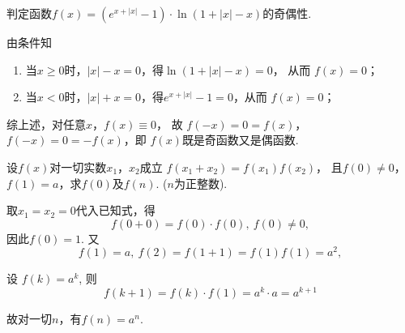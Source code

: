 \begin{problem}判定函数$f\left( x \right) = \left( e^{x + \left| x \right|} - 1 \right) \cdot \ln\left( 1 + \left| x \right| - x \right)$的奇偶性.
	
	\begin{solution}
		由条件知
		\begin{enumerate}
			\item 当$x \geq 0$时，$\left| x \right| - x = 0$，得$\ln\left( 1 + \left| x \right| - x \right) = 0$，
			从而 $f\left( x \right) = 0$；
			\item 当$x < 0$时，$\left| x \right| + x = 0$，得$e^{x + \left| x \right|} - 1 = 0$，从而 $f\left( x \right) = 0$；
		\end{enumerate}
		
		
		
		
		综上述，对任意$x$，$f\left( x \right) \equiv 0$，
		故
		$f\left( - x \right) = 0 = f\left( x \right)$，$f\left( - x \right) = 0 = - f\left( x \right)$，即
		$f\left( x \right)$既是奇函数又是偶函数.
		
	\end{solution}   
	
\end{problem}           



\begin{problem}设$f\left( x \right)$对一切实数$x_{1}$，$x_{2}$成立
	$f\left( x_{1} + x_{2} \right) = f\left( x_{1} \right)f\left( x_{2} \right)$，
	且$f\left( 0 \right) \neq 0$，$f\left( 1 \right) = a$，求$f\left( 0 \right)$及$f\left( n \right)$.
	($n$为正整数).
	
	\begin{solution} 
		取$x_{1} = x_{2} = 0$代入已知式，得		
		$$f\left( 0 + 0 \right) = f\left( 0 \right) \cdot f\left( 0 \right),\ f\left( 0 \right) \neq 0,$$
		因此$ f\left( 0 \right) = 1$.
		又
		$$f\left( 1 \right) = a,\ f\left( 2 \right) = f\left( 1 + 1 \right) = f\left( 1 \right)f\left( 1 \right) = a^{2},$$
		
		设 $f\left( k \right) = a^{k}$, 则
		$$f\left( k + 1 \right) = f\left( k \right) \cdot f\left( 1 \right) = a^{k} \cdot a = a^{k + 1}$$
		
		故对一切$n$，有$f\left( n \right) = a^{n}.$
		
	\end{solution}   
\end{problem}



